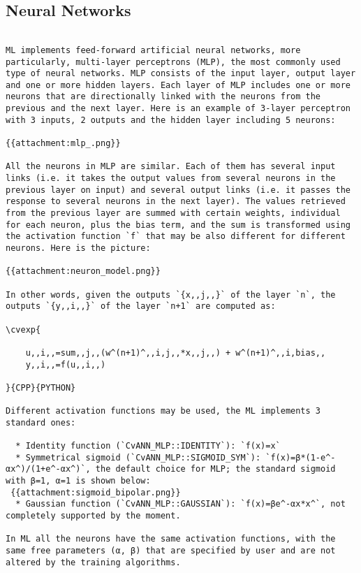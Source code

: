 \subsection{Neural Networks}
\begin{verbatim}

ML implements feed-forward artificial neural networks, more particularly, multi-layer perceptrons (MLP), the most commonly used type of neural networks. MLP consists of the input layer, output layer and one or more hidden layers. Each layer of MLP includes one or more neurons that are directionally linked with the neurons from the previous and the next layer. Here is an example of 3-layer perceptron with 3 inputs, 2 outputs and the hidden layer including 5 neurons:

{{attachment:mlp_.png}}

All the neurons in MLP are similar. Each of them has several input links (i.e. it takes the output values from several neurons in the previous layer on input) and several output links (i.e. it passes the response to several neurons in the next layer). The values retrieved from the previous layer are summed with certain weights, individual for each neuron, plus the bias term, and the sum is transformed using the activation function `f` that may be also different for different neurons. Here is the picture:

{{attachment:neuron_model.png}}

In other words, given the outputs `{x,,j,,}` of the layer `n`, the outputs `{y,,i,,}` of the layer `n+1` are computed as:

\cvexp{

    u,,i,,=sum,,j,,(w^(n+1)^,,i,j,,*x,,j,,) + w^(n+1)^,,i,bias,,
    y,,i,,=f(u,,i,,)

}{CPP}{PYTHON}

Different activation functions may be used, the ML implements 3 standard ones:

  * Identity function (`CvANN_MLP::IDENTITY`): `f(x)=x`
  * Symmetrical sigmoid (`CvANN_MLP::SIGMOID_SYM`): `f(x)=β*(1-e^-αx^)/(1+e^-αx^)`, the default choice for MLP; the standard sigmoid with β=1, α=1 is shown below:
 {{attachment:sigmoid_bipolar.png}}
  * Gaussian function (`CvANN_MLP::GAUSSIAN`): `f(x)=βe^-αx*x^`, not completely supported by the moment.

In ML all the neurons have the same activation functions, with the same free parameters (α, β) that are specified by user and are not altered by the training algorithms.


\end{verbatim}
